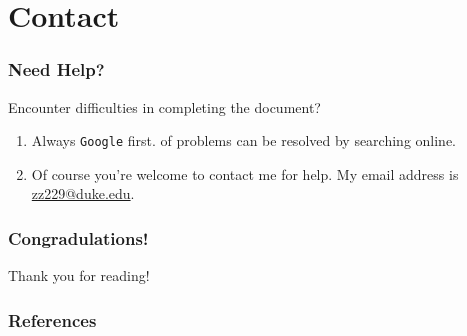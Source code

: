 \documentclass{beamer}
\begin{document}
\section{Contact}
\begin{frame}
    \frametitle{Need Help?}

    Encounter difficulties in completing the document?

    \begin{enumerate}
        \item Always \texttt{Google} first.  of problems can be resolved by searching online.
        \item Of course you're welcome to contact me for help. My email address is \href{mailto:zz229@duke.edu}{zz229@duke.edu}.
    \end{enumerate}
\end{frame}

\begin{frame}
    \frametitle{Congradulations!} 

    {
        \huge
        Thank you for reading!
    }

\end{frame}

\begin{frame}[fragile]
	\frametitle{References}
	\printbibliography
\end{frame}
\end{document}

